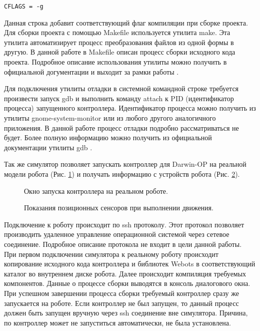 \lstset{language=[gnu] make}
\begin{lstlisting}
CFLAGS = -g
\end{lstlisting}

Данная строка добавит соответствующий флаг компиляции при сборке проекта. Для сборки проекта с помощью Makefile используется утилита make. Эта утилита автоматизирует процесс преобразования файлов из одной формы в другую. В данной работе в Makefile описан процесс сборки исходного кода проекта. Подробное описание использования утилиты можно получить в официальной догументации и выходит за рамки работы \cite{stallman2006gnu}.

Для подключения утилиты отладки в системной командной строке требуется произвести запуск gdb и выполнить команду attach к PID (идентификатор процесса) запущенного контроллера. Идентификатор процесса можно получить из утилиты gnome-system-monitor или из любого другого аналогичного приложения. В данной работе процесс отладки подробно рассматриваться не будет. Более полную информацию можно получить из официальной документации утилиты gdb \cite{stallman1992gdb}.

Так же симулятор позволяет запускать контроллер для Darwin-OP на реальной модели робота (Рис. \ref{im:1_webots_transfer}) и получать информацию с устройств робота (Рис. \ref{im:1_webots_position_sensors}).

\begin{figure}[h]
\caption{Окно запуска контроллера на реальном роботе.}
\label{im:1_webots_transfer}
\end{figure}

\begin{figure}[h]
\caption{Показания позиционных сенсоров при выполнении движения.}
\label{im:1_webots_position_sensors}
\end{figure}


Подключение к роботу происходит по ssh протоколу. Этот протокол позволяет производить удаленное управление операционной системой через сетевое соединение. Подробное описание протокола не входит в цели данной работы. При первом подключении симулятора к реальному роботу происходит копирование исходного кода контроллера и библиотек Webots в соответствующий каталог во внутреннем диске робота. Далее происходит компиляция требуемых компонентов. Данные о процессе сборки выводятся в консоль диалогового окна. При успешном завершении процесса сборки требуемый контроллер сразу же запускается на роботе. Если контроллер не был запущен, то данный процесс должен быть запущен вручную через ssh соединение вне симулятора. Причина, по контроллер может не запуститься автоматически, не была установлена.


